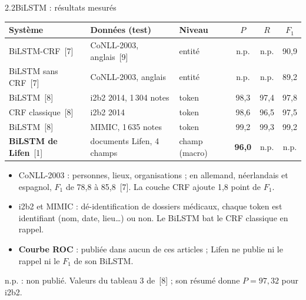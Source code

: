 \documentclass[11pt,aspectratio=169]{beamer}
\newcommand{\refs}[1]{{\color{mlblue}[#1]}}
\newcommand{\np}{{\color{mlgray}n.p.}}  %
\newcommand{\remarque}[1]{{\footnotesize\color{mlgray}#1\par}}
\begin{document}
\begin{frame}{2.2\quad BiLSTM : résultats mesurés}
  \small
  \begin{center}
    \setlength{\tabcolsep}{4.5pt}
    \renewcommand{\arraystretch}{1.1}
    \begin{tabular}{@{}lllccc@{}}
      \toprule
      \textbf{Système} & \textbf{Données (test)} & \textbf{Niveau} & $P$ & $R$ & $F_1$ \\
      \midrule
      BiLSTM-CRF~\refs{7}      & CoNLL-2003, anglais~\refs{9} & entité & \np & \np & 90,9 \\
      BiLSTM sans CRF~\refs{7} & CoNLL-2003, anglais          & entité & \np & \np & 89,2 \\
      BiLSTM~\refs{8}          & i2b2 2014, 1\,304 notes      & token  & 98,3 & 97,4 & 97,8 \\
      CRF classique~\refs{8}   & i2b2 2014                    & token  & 98,6 & 96,5 & 97,5 \\
      BiLSTM~\refs{8}          & MIMIC, 1\,635 notes          & token  & 99,2 & 99,3 & 99,2 \\
      \textbf{BiLSTM de Lifen}~\refs{1} & documents Lifen, 4 champs & champ (macro) & \textbf{96,0} & \np & \np \\
      \bottomrule
    \end{tabular}
  \end{center}

  \begin{itemize}\setlength{\itemsep}{1pt}
    \item CoNLL-2003 : personnes, lieux, organisations ; en allemand, néerlandais et espagnol,
      $F_1$ de 78,8 à 85,8~\refs{7}. La couche CRF ajoute 1,8 point de $F_1$.
    \item i2b2 et MIMIC : dé-identification de dossiers médicaux, chaque token est identifiant
      (nom, date, lieu…) ou non. Le BiLSTM bat le CRF classique en rappel.
    \item \textbf{Courbe ROC} : publiée dans aucun de ces articles ; Lifen ne publie ni le
      rappel ni le $F_1$ de son BiLSTM.
  \end{itemize}
  \remarque{n.p. : non publié. Valeurs du tableau 3 de~\refs{8} ; son résumé donne
  $P = 97{,}32$ pour i2b2.}
\end{frame}
\end{document}
